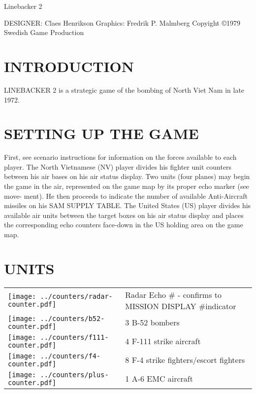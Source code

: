 Linebacker 2

DESIGNER: Claes Henrikson
Graphics: Fredrik P. Malmberg
Copyight ©1979
Swedish Game Production

\section*{INTRODUCTION}
LINEBACKER 2 is a strategic game
of the bombing of North Viet Nam in
late 1972.

\section*{SETTING UP THE GAME}
First, see scenario instructions for
information on the forces available
to each player. The North Vietnamese
(NV) player divides his fighter unit
counters between his air bases on his
air status display. Two units (four
planes) may begin the game in the
air, represented on the game map by
its proper echo marker (see move-
ment). He then proceeds to indicate
the number of available Anti-Aircraft
missiles on his SAM SUPPLY TABLE.
The United States (US) player
divides his available air units between
the target boxes on his air status
display and places the corresponding
echo counters face-down in the US
holding area on the game map.

\newcommand{\bfiftytwo}{\texttt{[image: ../counters/b52-counter.pdf]}}
\newcommand{\ffour}{\texttt{[image: ../counters/f4-counter.pdf]}}
\newcommand{\foneeleven}{\texttt{[image: ../counters/f111-counter.pdf]}}
\newcommand{\plus}{\texttt{[image: ../counters/plus-counter.pdf]}}
\newcommand{\migtwoone}{\texttt{[image: ../counters/mig21-counter.pdf]}}
\newcommand{\radar}{\texttt{[image: ../counters/radar-counter.pdf]}}
\newcommand{\hit}{\texttt{[image: ../counters/hit-counter.pdf]}}
\newcommand{\sam}{\texttt{[image: ../counters/sam-counter.pdf]}}

\section*{UNITS}
\noindent
\begin{tabularx}{\linewidth}{@{} m{0.3in} X @{}}
   \radar & Radar Echo \# - confirms to MISSION DISPLAY \#indicator \\
   \bfiftytwo & 3 B-52 bombers \\
   \foneeleven & 4 F-111 strike aircraft \\
   \ffour & 8 F-4 strike fighters/escort fighters \\
   \plus & 1 A-6 EMC aircraft \\
\end{tabularx}

